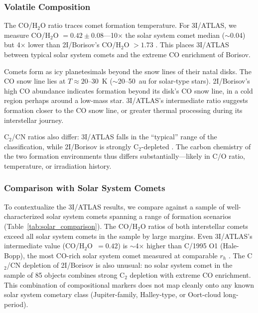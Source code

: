 \documentclass[preprint2]{aastex631}
\begin{document}
\subsubsection{Volatile Composition}

The CO/H$_2$O ratio traces comet formation temperature. For 3I/ATLAS, we measure CO/H$_2$O $= 0.42 \pm 0.08$---10$\times$ the solar system comet median ($\sim$0.04) but 4$\times$ lower than 2I/Borisov's CO/H$_2$O $> 1.73$ \citep{bodewits20}. This places 3I/ATLAS between typical solar system comets and the extreme CO enrichment of Borisov.

Comets form as icy planetesimals beyond the snow lines of their natal disks. The CO snow line lies at $T \approx 20$--30~K ($\sim$20--50~au for solar-type stars). 2I/Borisov's high CO abundance indicates formation beyond its disk's CO snow line, in a cold region perhaps around a low-mass star. 3I/ATLAS's intermediate ratio suggests formation closer to the CO snow line, or greater thermal processing during its interstellar journey.

C$_2$/CN ratios also differ: 3I/ATLAS falls in the ``typical'' range of the \citet{ahearn95} classification, while 2I/Borisov is strongly C$_2$-depleted \citep{opitom20}. The carbon chemistry of the two formation environments thus differs substantially---likely in C/O ratio, temperature, or irradiation history.

\subsubsection{Comparison with Solar System Comets}

To contextualize the 3I/ATLAS results, we compare against a sample of well-characterized solar system comets spanning a range of formation scenarios (Table~\ref{tab:solar_comparison}). The CO/H$_2$O ratios of both interstellar comets exceed all solar system comets in the sample by large margins. Even 3I/ATLAS's intermediate value (CO/H$_2$O~$=0.42$) is $\sim$4$\times$ higher than C/1995 O1 (Hale-Bopp), the most CO-rich solar system comet measured at comparable $r_h$ \citep{bockelee04}. The C$_2$/CN depletion of 2I/Borisov is also unusual: no solar system comet in the \citet{ahearn95} sample of 85 objects combines strong C$_2$ depletion with extreme CO enrichment. This combination of compositional markers does not map cleanly onto any known solar system cometary class (Jupiter-family, Halley-type, or Oort-cloud long-period).
\end{document}
